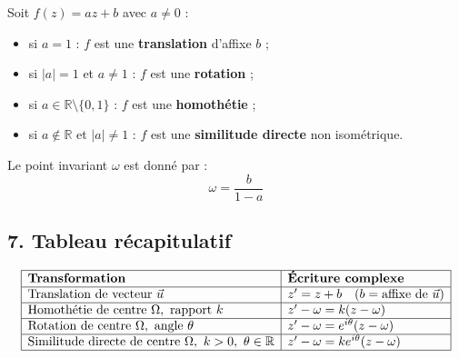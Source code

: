 Soit $f(z) = az + b$ avec $a \neq 0$ :
\begin{itemize}
  \item si $a = 1$ : $f$ est une \textbf{translation} d’affixe $b$ ;
  \item si $|a| = 1$ et $a \neq 1$ : $f$ est une \textbf{rotation} ;
  \item si $a \in \mathbb{R} \setminus \{0,1\}$ : $f$ est une \textbf{homothétie} ;
  \item si $a \notin \mathbb{R}$ et $|a| \ne 1$ : $f$ est une \textbf{similitude directe} non isométrique.
\end{itemize}

Le point invariant $\omega$ est donné par :
\[
\omega = \frac{b}{1 - a}
\]

\subsection*{7. Tableau récapitulatif}

\[
\begin{array}{|l|l|}
\hline
\textbf{Transformation} & \textbf{Écriture complexe} \\
\hline
\text{Translation de vecteur } \vec{u} & z' = z + b \quad (b = \text{affixe de } \vec{u}) \\
\hline
\text{Homothétie de centre } \Omega,\ \text{rapport } k & z' - \omega = k(z - \omega) \\
\hline
\text{Rotation de centre } \Omega,\ \text{angle } \theta & z' - \omega = e^{i\theta}(z - \omega) \\
\hline
\text{Similitude directe de centre } \Omega,\ k > 0,\ \theta\in\mathbb{R} & z' - \omega = ke^{i\theta}(z - \omega) \\
\hline
\end{array}
\]


